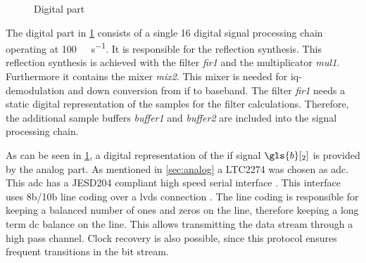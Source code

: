 \documentclass[12pt,a4paper,parskip=full,abstract=true,BCOR=12mm,twoside,open=right]{scrreprt}
\def\device#1{\mbox{\textit{#1}}}
\begin{document}
\begin{figure}[htb]
    \caption{Digital part}
    \label{fig:digital}
\end{figure}

The digital part in \cref{fig:digital} consists of a single \SI{16}{\bit} digital signal processing
chain operating at \SI{100}{\mega\samples\per\second}. It is responsible
for the reflection synthesis. This reflection synthesis is achieved with
the filter \device{fir1} and the multiplicator \device{mul1}. Furthermore
it contains the mixer \device{mix2}. This mixer is needed for \gls{iq}-demodulation
and down conversion from \gls{if} to baseband. The filter \device{fir1}
needs a static digital representation of the samples for the filter calculations.
Therefore, the additional sample buffers \device{buffer1} and \device{buffer2} are
included into the signal processing chain.

As can be seen in \cref{fig:digital}, a digital representation of the \gls{if}
signal $\gls{b}[_2]$ is provided by the analog part. As mentioned in \cref{sec:analog}
a LTC2274 was chosen as \gls{adc}. This \gls{adc} has a
JESD204 compliant high speed serial interface \cite{ltc2274}. This interface uses 8b/10b
line coding over a \gls{lvds} connection \cite{jesd205B.01}. The line coding
is responsible for keeping a balanced number of ones and zeros on the line, therefore keeping a long term
\gls{dc} balance on the line. This allows transmitting the data stream through a high pass
channel. Clock recovery is also possible, since this protocol ensures frequent transitions
in the bit stream.
\end{document}
